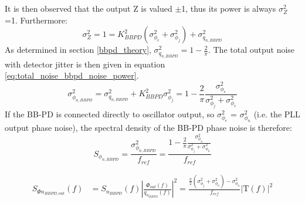 	 It is then observed that the output Z is valued $\pm$1, thus its power is always $\sigma_Z^2$=1. Furthermore:
	\begin{equation}
	 	\sigma^2_{Z} = 1 = K_{BBPD}^2(\sigma^2_{\phi_e} +\sigma^2_{\phi_j})  + \sigma^2_{q_{n,BBPD}}
	\end{equation}
	 As determined in section \ref{bbpd_theory}, $\sigma^2_{q_{n,BBPD}} = 1 - \frac{2}{\pi}$. The total output noise with detector jitter is then given in equation \ref{eq:total_noise_bbpd_noise_power}.
			\begin{equation}\label{eq:total_noise_bbpd_noise_power}
				\sigma^2_{\phi_{n,BBPD}} =  \sigma^2_{q_{n,BBPD}} + K_{BBPD}^2\sigma^2_{\phi_j} =  1 - \frac{2}{\pi}\frac{\sigma^2_{\phi_e}}{\sigma^2_{\phi_j} + \sigma^2_{\phi_e}}
			\end{equation}
	If the BB-PD is connected directly to oscillator output, so $\sigma^2_{\phi_e}$ = $\sigma^2_{\phi_n}$ (i.e. the PLL output phase noise), the spectral density of the BB-PD phase noise is therefore:
		\begin{equation}
			S_{\phi_{n,BBPD}} = \frac{\sigma^2_{\phi_{n,BBPD}}}{f_{ref}} =  \frac{1 - \frac{2}{\pi}\frac{\sigma^2_{\phi_n}}{\sigma^2_{\phi_j} + \sigma^2_{\phi_n}}}{f_{ref}}
		\end{equation}

		\begin{align}\label{eq:out_psd_bbpd_pll3}
			S_{\Phi n_{BBPD,out}}(f) &= S_{n_{BBPD}}(f)\left|\frac{\Phi_{out}(f)}{q_{n_{BBPD}}(f)}\right|^2 = \frac{\frac{\pi}{2}(\sigma^2_{\phi_j} + \sigma^2_{\phi_n})-\sigma^2_{\phi_n}}{f_{ref}}\left|\mathrm{T}(f)\right|^2
		\end{align}



